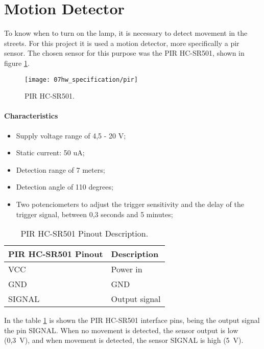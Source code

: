 \section{Motion Detector}
To know when to turn on the lamp, it is necessary to detect movement in the streets. For this project it is used a motion detector, more specifically a \ac{pir} sensor. The chosen sensor for this purpose was the PIR HC-SR501, shown in figure \ref{fig:pir}.  \cite{pir}

\begin{figure}[H]
	\centering
	\texttt{[image: 07hw\_specification/pir]}
	\caption{PIR HC-SR501.}
	\label{fig:pir}
\end{figure}

\paragraph*{Characteristics}
\begin{itemize}
	\item Supply voltage range of 4,5 - 20 V;
	\item Static current: 50 uA;
	\item Detection range of 7 meters;
	\item Detection angle of 110 degrees;
	\item Two potenciometers to adjust the trigger sensitivity and the delay of the trigger signal, between 0,3 seconds and 5 minutes;
\end{itemize}

\begin{table}[H]
	\centering
	\begin{tabular}{|m{5cm}|m{6cm}|}
		\hline
		\textbf{PIR HC-SR501 Pinout} & \textbf{Description}
		\\\hline\hline
		VCC & Power in
		\\\hline
		GND & GND
		\\\hline
		SIGNAL & Output signal
		\\\hline
	\end{tabular}
	
	\caption{PIR HC-SR501 Pinout Description.}
	\label{table:desc_pir}
\end{table}

In the table \ref{table:desc_pir} is shown the PIR HC-SR501 interface pins, being the output signal the pin SIGNAL. When no movement is detected, the sensor output is low (0,3~V), and when movement is detected, the sensor SIGNAL is high (5~V). 

